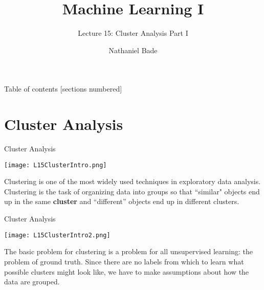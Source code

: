 \documentclass[10pt, table, dvipsnames,xcdraw,handout]{beamer}
\title{Machine Learning I}
\subtitle{Lecture 15: Cluster Analysis Part I}
\date{}
\author{Nathaniel Bade}
\institute{Northeastern University Department of Mathematics}
\begin{document}
\maketitle

\begin{frame}{Table of contents}
  [sections numbered]
  \tableofcontents[hideallsubsections]
\end{frame}




%
% 
%
%
%
%
%


\section{Cluster Analysis}

\begin{frame}[fragile]{Cluster Analysis}
  \begin{minipage}[t][0.5\textheight][t]{\textwidth}
	\centering \texttt{[image: L15ClusterIntro.png]} 
  \end{minipage}
  \vfill
\begin{minipage}[t][0.5\textheight][t]{\textwidth}
Clustering is one of the most widely used techniques in exploratory data analysis. Clustering is the task of organizing data into groups so that ``similar" objects end up in the same \textbf{cluster} and ``different'' objects end up in different clusters. 
\end{minipage}
\end{frame}



\begin{frame}[fragile]{Cluster Analysis}
  \begin{minipage}[t][0.5\textheight][t]{\textwidth}
	\centering \texttt{[image: L15ClusterIntro2.png]} 
  \end{minipage}
  \vfill
\begin{minipage}[t][0.5\textheight][t]{\textwidth}
The basic problem for clustering is a problem for all unsupervised learning: the problem of ground truth. Since there are no labels from which to learn what possible clusters might look like, we have to make assumptions about how the data are grouped. 
\end{minipage}
\end{frame}
\end{document}
